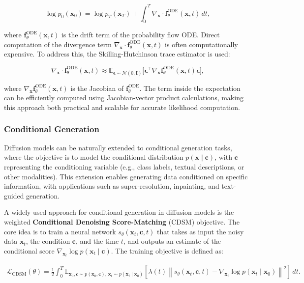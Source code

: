 \[
\log p_0(\mathbf{x}_0) = \log p_T(\mathbf{x}_T) + \int_0^T \nabla_{\mathbf{x}} \cdot \mathbf{f}_\theta^{\text{ODE}}(\mathbf{x}, t) \, dt,
\]

where \( \mathbf{f}_\theta^{\text{ODE}}(\mathbf{x}, t) \) is the drift term of the probability flow ODE. Direct computation of the divergence term \( \nabla_{\mathbf{x}} \cdot \mathbf{f}_\theta^{\text{ODE}}(\mathbf{x}, t) \) is often computationally expensive. To address this, the Skilling-Hutchinson trace estimator is used:

\[
\nabla_{\mathbf{x}} \cdot \mathbf{f}_\theta^{\text{ODE}}(\mathbf{x}, t) \approx \mathbb{E}_{\mathbf{\epsilon} \sim \mathcal{N}(0, \mathbf{I})} \big[ \mathbf{\epsilon}^\top \nabla_{\mathbf{x}} \mathbf{f}_\theta^{\text{ODE}}(\mathbf{x}, t) \mathbf{\epsilon} \big],
\]

where \( \nabla_{\mathbf{x}} \mathbf{f}_\theta^{\text{ODE}}(\mathbf{x}, t) \) is the Jacobian of \( \mathbf{f}_\theta^{\text{ODE}} \). The term inside the expectation can be efficiently computed using Jacobian-vector product calculations, making this approach both practical and scalable for accurate likelihood computation.


\subsubsection{Conditional Generation}

Diffusion models can be naturally extended to conditional generation tasks, where the objective is to model the conditional distribution \( p(\mathbf{x} \mid \mathbf{c}) \), with \( \mathbf{c} \) representing the conditioning variable (e.g., class labels, textual descriptions, or other modalities). This extension enables generating data conditioned on specific information, with applications such as super-resolution, inpainting, and text-guided generation.

A widely-used approach for conditional generation in diffusion models is the weighted \textbf{Conditional Denoising Score-Matching} (CDSM) objective. The core idea is to train a neural network \( s_\theta(\mathbf{x}_t, \mathbf{c}, t) \) that takes as input the noisy data \( \mathbf{x}_t \), the condition \( \mathbf{c} \), and the time \( t \), and outputs an estimate of the conditional score \( \nabla_{\mathbf{x}_t} \log p(\mathbf{x}_t \mid \mathbf{c}) \). The training objective is defined as:

\begin{align}
    \mathcal{L}_{\text{CDSM}}(\theta) = 
    \frac{1}{2} \int_0^T \mathbb{E}_{\mathbf{x}_0, \mathbf{c} \sim p(\mathbf{x}_0, \mathbf{c}), \, \mathbf{x}_t \sim p(\mathbf{x}_t \mid \mathbf{x}_0)} 
    \left[ \lambda(t) \left\| s_\theta(\mathbf{x}_t, \mathbf{c}, t) - \nabla_{\mathbf{x}_t} \log p(\mathbf{x}_t \mid \mathbf{x}_0) \right\|^2 \right] \, dt.
\end{align}

